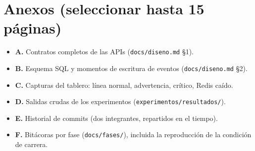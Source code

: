 \documentclass[12pt,a4paper]{article}
\begin{document}
\section*{Anexos (seleccionar hasta 15 páginas)}
\begin{itemize}[leftmargin=*]
  \item \textbf{A.} Contratos completos de las APIs (\texttt{docs/diseno.md} §1).
  \item \textbf{B.} Esquema SQL y momentos de escritura de eventos (\texttt{docs/diseno.md} §2).
  \item \textbf{C.} Capturas del tablero: línea normal, advertencia, crítico, Redis caído.
  \item \textbf{D.} Salidas crudas de los experimentos (\texttt{experimentos/resultados/}).
  \item \textbf{E.} Historial de commits (dos integrantes, repartidos en el tiempo).
  \item \textbf{F.} Bitácoras por fase (\texttt{docs/fases/}), incluida la reproducción
        de la condición de carrera.
\end{itemize}
\end{document}

